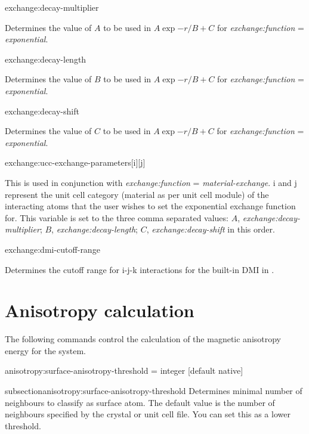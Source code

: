 {\zicf exchange:decay-multiplier} Determines the value of $A$ to be used in $A\exp{-r/B}+C$ for \textit{exchange:function} = \textit{exponential}.

{\zicf exchange:decay-length} Determines the value of $B$ to be used in $A\exp{-r/B}+C$ for \textit{exchange:function} = \textit{exponential}.

{\zicf exchange:decay-shift} Determines the value of $C$ to be used in $A\exp{-r/B}+C$ for \textit{exchange:function} = \textit{exponential}.

{\zicf exchange:ucc-exchange-parameters[i][j]} This is used in conjunction with \textit{exchange:function} = \textit{material-exchange}. i and j represent the unit cell category (material as per unit cell module) of the interacting atoms that the user wishes to set the exponential exchange function for. This variable is set to the three comma separated values: $A$, \textit{exchange:decay-multiplier}; $B$, \textit{exchange:decay-length}; $C$, \textit{exchange:decay-shift} in this order.

{\zicf exchange:dmi-cutoff-range} Determines the cutoff range for i-j-k interactions for the built-in DMI in \vampire.

\section*{Anisotropy calculation}
 The following commands control the calculation of the magnetic anisotropy energy for the system.

{\zicf anisotropy:surface-anisotropy-threshold = integer [default native]}
{subsection}{anisotropy:surface-anisotropy-threshold} Determines minimal number of neighbours to classify as surface atom. The default value is the number of neighbours specified by the crystal or unit cell file. You can set this as a lower threshold.

